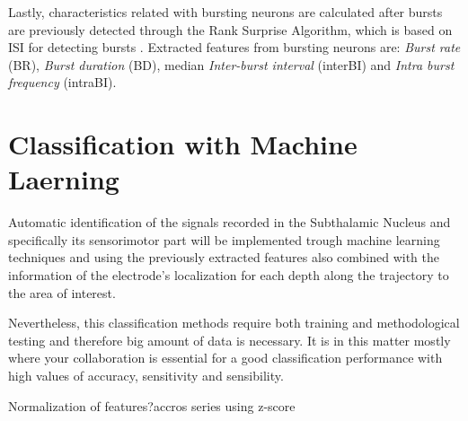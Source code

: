 Lastly, characteristics related with bursting neurons are calculated after bursts are previously detected through the Rank Surprise Algorithm, which is based on ISI for detecting bursts \cite{Gourevitch2007}. Extracted features from bursting neurons are: \textit{Burst rate} (BR), \textit{Burst duration} (BD), median \textit{Inter-burst interval} (interBI) and \textit{Intra burst frequency} (intraBI).




\section{Classification with Machine Laerning }
Automatic identification of the signals recorded in the Subthalamic Nucleus and specifically its sensorimotor part will be implemented trough machine learning techniques and using the previously extracted features also combined with the information of the electrode's localization for each depth along the trajectory to the area of interest.

Nevertheless, this classification methods require both training and methodological testing and therefore big amount of data is necessary. It is in this matter mostly where your collaboration is essential for a good classification performance with high values of accuracy, sensitivity and sensibility.

Normalization of features?accros series using z-score
